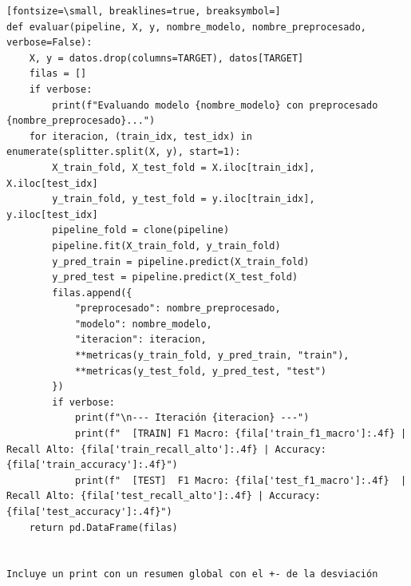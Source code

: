 \documentclass[12pt,a4paper,oneside]{book}
\begin{document}
\begin{iaprompt}
\begin{Verbatim}[fontsize=\small, breaklines=true, breaksymbol=]
def evaluar(pipeline, X, y, nombre_modelo, nombre_preprocesado, verbose=False):
    X, y = datos.drop(columns=TARGET), datos[TARGET]
    filas = []
    if verbose:
        print(f"Evaluando modelo {nombre_modelo} con preprocesado {nombre_preprocesado}...")
    for iteracion, (train_idx, test_idx) in enumerate(splitter.split(X, y), start=1):
        X_train_fold, X_test_fold = X.iloc[train_idx], X.iloc[test_idx]
        y_train_fold, y_test_fold = y.iloc[train_idx], y.iloc[test_idx]
        pipeline_fold = clone(pipeline)
        pipeline.fit(X_train_fold, y_train_fold)
        y_pred_train = pipeline.predict(X_train_fold)
        y_pred_test = pipeline.predict(X_test_fold)
        filas.append({
            "preprocesado": nombre_preprocesado,
            "modelo": nombre_modelo, 
            "iteracion": iteracion,
            **metricas(y_train_fold, y_pred_train, "train"),
            **metricas(y_test_fold, y_pred_test, "test")
        })
        if verbose:
            print(f"\n--- Iteración {iteracion} ---")
            print(f"  [TRAIN] F1 Macro: {fila['train_f1_macro']:.4f} | Recall Alto: {fila['train_recall_alto']:.4f} | Accuracy: {fila['train_accuracy']:.4f}")
            print(f"  [TEST]  F1 Macro: {fila['test_f1_macro']:.4f}  | Recall Alto: {fila['test_recall_alto']:.4f} | Accuracy: {fila['test_accuracy']:.4f}")
    return pd.DataFrame(filas)


Incluye un print con un resumen global con el +- de la desviación 
\end{Verbatim}
\end{iaprompt}
\end{document}
